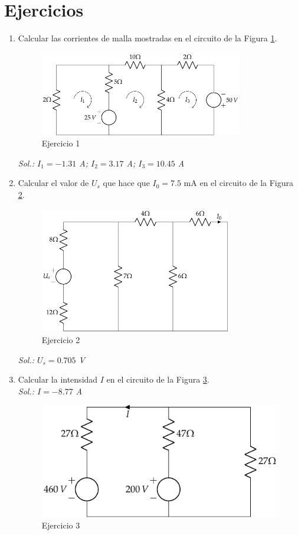 \section{Ejercicios}

\begin{enumerate}
\item Calcular las corrientes de malla mostradas en el circuito de la Figura \ref{fig.ejercicio2_tema1}.
		\begin{figure}[H]
			\centering	\includegraphics[height=3.7cm]{../figs/ej2_BT1.pdf}
			\caption{Ejercicio 1}
			\label{fig.ejercicio2_tema1}
		\end{figure}
		\emph{Sol.: $I_1=-1.31$ A; $I_2=3.17$ A; $I_3=10.45$ A}
		
\item Calcular el valor de $U_s$ que hace que $I_0=7.5$ mA en el circuito de la Figura \ref{fig.ejercicio3_tema1}. 
		\begin{figure}[H]
			\centering	\includegraphics[height=5.5cm]{../figs/ej3_BT1.pdf}
			\caption{Ejercicio 2}
			\label{fig.ejercicio3_tema1}
		\end{figure}
		\emph{Sol.: $U_s=0.705$ V}    
		
\item Calcular la intensidad $I$ en el circuito de la Figura \ref{fig.ejercicio4_tema1}. \\
\emph{Sol.: $I=-8.77 $ A}
		\begin{figure}[H]
			\centering
			\includegraphics{../figs/ej4_BT1.pdf}
			\caption{Ejercicio 3}
			\label{fig.ejercicio4_tema1}
		\end{figure}
		

\end{enumerate}

